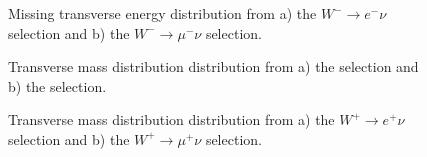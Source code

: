\begin{figure}[h]
\begin{minipage}[h]{0.49\linewidth}
\end{minipage}
\hfill
\begin{minipage}[h]{0.49\linewidth}
\end{minipage}

\caption{Missing transverse energy distribution from a) the $W^{-} \to e^{-} \nu$ selection and  b) the $W^{-} \to \mu^{-} \nu$ selection.}
\end{figure}


\begin{figure}[h]
\begin{minipage}[h]{0.49\linewidth}
\end{minipage}
\hfill
\begin{minipage}[h]{0.49\linewidth}
\end{minipage}

\caption{Transverse mass distribution distribution from a) the \wenu selection and  b) the \wmunu selection.}
\end{figure}

\begin{figure}[h]
\begin{minipage}[h]{0.49\linewidth}
\end{minipage}
\hfill
\begin{minipage}[h]{0.49\linewidth}
\end{minipage}

\caption{Transverse mass distribution distribution from  a) the $W^{+} \to e^{+} \nu$ selection and  b) the $W^{+} \to \mu^{+} \nu$ selection.}
\end{figure}

